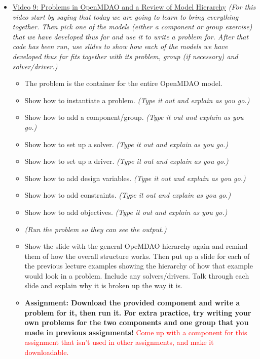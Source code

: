 \documentclass[12pt, letterpaper]{article}
\begin{document}
\begin{itemize}
	\item \underline{Video 9: Problems in OpenMDAO and a Review of Model Hierarchy} \textit{(For this video start by saying that today we are going to 	learn to bring everything together. Then pick one of the models (either a component or group exercise) that we have developed thus far and use it to write a problem for. After that code has been run, use slides to show how each of the models we have developed thus far fits together with its 			problem, group (if necessary) and solver/driver.)}
		\begin{itemize}
			\item The problem is the container for the entire OpenMDAO model.
			\item Show how to instantiate a problem. \textit{(Type it out and explain as you go.)}
			\item Show how to add a component/group. \textit{(Type it out and explain as you go.)}
			\item Show how to set up a solver. \textit{(Type it out and explain as you go.)}
			\item Show how to set up a driver. \textit{(Type it out and explain as you go.)}
			\item Show how to add design variables. \textit{(Type it out and explain as you go.)}
			\item Show how to add constraints. \textit{(Type it out and explain as you go.)}
			\item Show how to add objectives. \textit{(Type it out and explain as you go.)}
			\item \textit{(Run the problem so they can see the output.)}
			\item Show the slide with the general OpeMDAO hierarchy again and remind them of how the overall structure works. Then put up a slide 					for each of the previous lecture examples showing the hierarchy of how that example would look in a problem. Include any solvers/drivers. Talk 					through each slide and explain why it is broken up the way it is.
			\item \textbf{Assignment: Download the provided component and write a problem for it, then run it. For extra practice, try writing your own problems for the two components and one group that you made in previous assignments!} \textcolor{red}{Come up with a component for this assignment that isn't used in other assignments, and make it downloadable.}
		\end{itemize}


\end{itemize}
\end{document}
